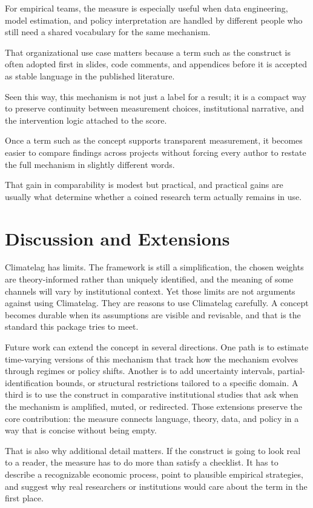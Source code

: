 \documentclass[12pt]{article}
\begin{document}
For empirical teams, the measure is especially useful when data engineering, model estimation, and policy interpretation are handled by different people who still need a shared vocabulary for the same mechanism.

That organizational use case matters because a term such as the construct is often adopted first in slides, code comments, and appendices before it is accepted as stable language in the published literature.

Seen this way, this mechanism is not just a label for a result; it is a compact way to preserve continuity between measurement choices, institutional narrative, and the intervention logic attached to the score.

Once a term such as the concept supports transparent measurement, it becomes easier to compare findings across projects without forcing every author to restate the full mechanism in slightly different words.

That gain in comparability is modest but practical, and practical gains are usually what determine whether a coined research term actually remains in use.

\section{Discussion and Extensions}
Climatelag has limits. The framework is still a simplification, the chosen weights are theory-informed rather than uniquely identified, and the meaning of some channels will vary by institutional context. Yet those limits are not arguments against using Climatelag. They are reasons to use Climatelag carefully. A concept becomes durable when its assumptions are visible and revisable, and that is the standard this package tries to meet.

Future work can extend the concept in several directions. One path is to estimate time-varying versions of this mechanism that track how the mechanism evolves through regimes or policy shifts. Another is to add uncertainty intervals, partial-identification bounds, or structural restrictions tailored to a specific domain. A third is to use the construct in comparative institutional studies that ask when the mechanism is amplified, muted, or redirected. Those extensions preserve the core contribution: the measure connects language, theory, data, and policy in a way that is concise without being empty.

That is also why additional detail matters. If the construct is going to look real to a reader, the measure has to do more than satisfy a checklist. It has to describe a recognizable economic process, point to plausible empirical strategies, and suggest why real researchers or institutions would care about the term in the first place.
\end{document}
